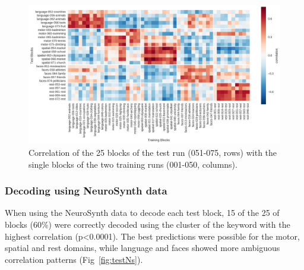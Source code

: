 \documentclass[fleqn,10pt]{SelfArx} %
\begin{document}
\begin{figure}[htbp]
	\begin{minipage}{\textwidth}
		\renewcommand{\familydefault}{\sfdefault}\normalfont
		\centering
		\includegraphics[width=\columnwidth]{./figs/fig8_blockWiseHeat.png}
				\vspace*{-3mm}
		\caption{Correlation of the 25 blocks of the test run (051-075, rows) with the single blocks of the two training runs (001-050, columns).}%
		\label{fig:testBlockHeat}
	\end{minipage}
\end{figure}

\subsubsection*{Decoding using NeuroSynth data}

When using the NeuroSynth data to decode each test block, 15 of the 25 of blocks (60\%) were correctly decoded using the cluster of the keyword with the highest correlation (p<0.0001). The best predictions were possible for the motor, spatial and rest domains, while language and faces showed more ambiguous correlation patterns (Fig~\ref{fig:testNs}).
\end{document}
